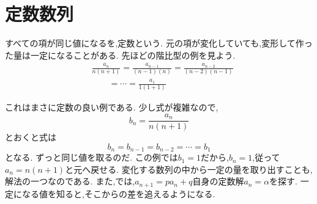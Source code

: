 
\section{定数数列}\label{節：おまけ：定数数列}
  すべての項が同じ値になるを,定数という.
  元の項が変化していても,変形して作った量は一定になることがある.
  先ほどの階比型の例を見よう.
  \begin{align*}
    &\frac{a_{n}}{n(n+1)}=\frac{a_{n-1}}{(n-1)(n)}=\frac{a_{n-2}}{(n-2)(n-1)}\\
    &\qquad=\cdots=\frac{a_{1}}{1(1+1)}
  \end{align*}

  これはまさに定数の良い例である.
  少し式が複雑なので,
  \[
    b_n=\frac{a_{n}}{n(n+1)}
  \]
  とおくと式は
  \[
    b_n=b_{n-1}=b_{n-2}=\cdots=b_1
  \]
  となる.
  ずっと同じ値を取るのだ.
  この例では$b_1=1$だから,$b_n=1$,従って$a_n=n(n+1)$と元へ戻せる.
  変化する数列の中から一定の量を取り出すことも,解法の一つなのである.
  また,では,$a_{n+1}=pa_n+q$自身の定数解$a_n=\alpha$を探す.
  一定になる値を知ると,そこからの差を追えるようになる.
